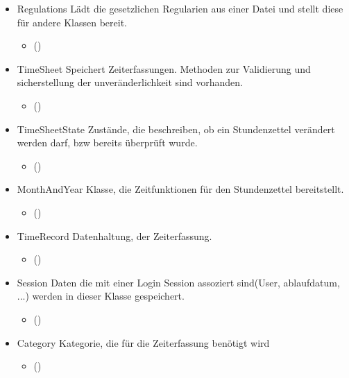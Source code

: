 \begin{itemize}
            \item{Regulations}
                Lädt die gesetzlichen Regularien aus einer Datei und stellt diese für andere Klassen bereit.
                \begin{itemize}
                    \item()
                \end{itemize}

            \item{TimeSheet}
                Speichert Zeiterfassungen. Methoden zur Validierung und sicherstellung der unveränderlichkeit sind vorhanden.
                \begin{itemize}
                    \item()
                \end{itemize}

            \item{TimeSheetState}
                Zustände, die beschreiben, ob ein Stundenzettel verändert werden darf, bzw bereits überprüft wurde.
                \begin{itemize}
                    \item()
                \end{itemize}

            \item{MonthAndYear}
                Klasse, die Zeitfunktionen für den Stundenzettel bereitstellt.
                \begin{itemize}
                    \item()
                \end{itemize}

            \item{TimeRecord}
                Datenhaltung, der Zeiterfassung.
                \begin{itemize}
                    \item()
                \end{itemize}

            \item{Session}
                Daten die mit einer Login Session assoziert sind(User, ablaufdatum, ...) werden in dieser Klasse gespeichert.
                \begin{itemize}
                    \item()
                \end{itemize}

            \item{Category}
                Kategorie, die für die Zeiterfassung benötigt wird
                \begin{itemize}
                    \item()
                \end{itemize}


\end{itemize}
